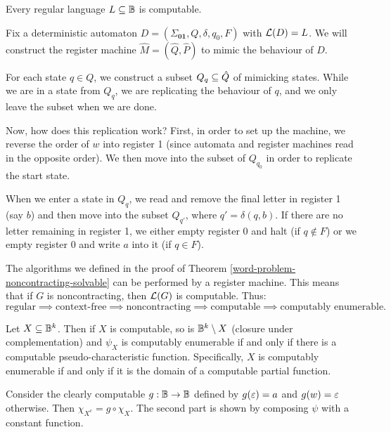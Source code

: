 \documentclass{article}
\begin{document}
\begin{theorem}
	Every regular language $L \subseteq \mathbb{B}$ is computable.
\end{theorem}

\begin{prf}
	Fix a deterministic automaton $D = (\Sigma_\textbf{01}, Q, \delta, q_0, F)$ with $\mathcal{L}(D) = L$. We will construct the register machine $\hat M = (\hat Q, \hat P)$ to mimic the behaviour of $D$.
	    
	For each state $q \in Q$, we construct a subset $Q_q \subseteq \hat Q$ of mimicking states. While we are in a state from $Q_q$, we are replicating the behaviour of $q$, and we only leave the subset when we are done.
	    
	Now, how does this replication work? First, in order to set up the machine, we reverse the order of $w$ into register 1 (since automata and register machines read in the opposite order). We then move into the subset of $Q_{q_0}$ in order to replicate the start state.
	    
	When we enter a state in $Q_q$, we read and remove the final letter in register 1 (say $b$) and then move into the subset $Q_{q'}$, where $q' = \delta(q, b)$. If there are no letter remaining in register 1, we either empty register 0 and halt (if $q \notin F$) or we empty register 0 and write $a$ into it (if $q \in F$). 
\end{prf}

The algorithms we defined in the proof of Theorem \ref{word-problem-noncontracting-solvable} can be performed by a register machine. This means that if $G$ is noncontracting, then $\mathcal{L}(G)$ is computable. Thus:
\[
	\text{regular} \implies \text{context-free} \implies \text{noncontracting} \implies \text{computable} \implies \text{computably enumerable}.
\]

\begin{proposition}[Computability]
	Let $X \subseteq \mathbb{B}^k$. Then if $X$ is computable, so is $\mathbb{B}^k \setminus X$ (closure under complementation) and $\psi_X$ is computably enumerable if and only if there is a computable pseudo-characteristic function. Specifically, $X$ is computably enumerable if and only if it is the domain of a computable partial function.
\end{proposition}

\begin{prf}
	Consider the clearly computable $g: \mathbb{B} \to \mathbb{B}$ defined by $g(\varepsilon) = a$ and $g(w) = \varepsilon$ otherwise. Then $\chi_{X^c} = g \circ \chi_X$.
	The second part is shown by composing $\psi$ with a constant function.
\end{prf}
\end{document}
